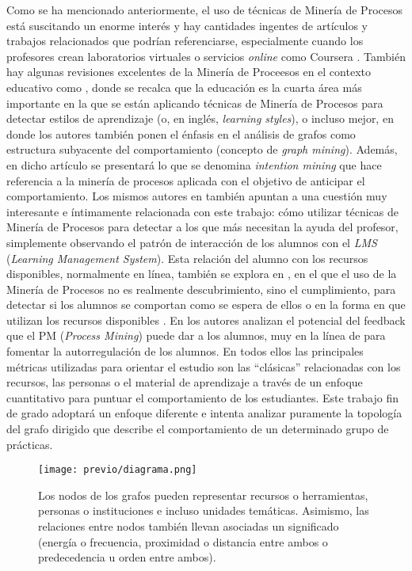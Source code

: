 Como se ha mencionado anteriormente, el uso de técnicas de Minería de Procesos está suscitando un enorme interés y hay cantidades ingentes de artículos y trabajos relacionados que podrían referenciarse, especialmente cuando los profesores crean laboratorios virtuales \cite{Elmoazen_2023} o servicios \emph{online} como Coursera \cite{mukala2015learning}. También hay algunas revisiones excelentes de la Minería de Proceesos en el contexto educativo como \cite{dos2019process}, donde se recalca que la educación es la cuarta área más importante en la que se están aplicando técnicas de Minería de Procesos para detectar estilos de aprendizaje (o, en inglés, \emph{learning styles}), o incluso mejor, en \cite{bogarin2018survey} donde los autores también ponen el énfasis en el análisis de grafos como estructura subyacente del comportamiento (concepto de \emph{graph mining}). Además, en dicho artículo se presentará lo que se denomina \emph{intention mining} que hace referencia a la minería de procesos aplicada con el objetivo de anticipar el comportamiento. Los mismos autores en \cite{bogarin2018discovering} también apuntan a una cuestión muy interesante e íntimamente relacionada con este trabajo: cómo utilizar técnicas de Minería de Procesos para detectar a los que más necesitan la ayuda del profesor, simplemente observando el patrón de interacción de los alumnos con el \emph{LMS} (\emph{Learning Management System}). Esta relación del alumno con los recursos disponibles, normalmente en línea, también se explora en \cite{mukala2015learning}, en el que el uso de la Minería de Procesos no es realmente descubrimiento, sino el cumplimiento, para detectar si los alumnos se comportan como se espera de ellos o en la forma en que utilizan los recursos disponibles \cite{juhavnak2019using}. En \cite{sedrakyan2016process} los autores analizan el potencial del
feedback que el PM (\emph{Process Mining}) puede dar a los alumnos, muy en la línea de \citep{Keller_1968} para fomentar la autorregulación de los alumnos. En todos ellos las principales métricas utilizadas para orientar el estudio son las ``clásicas'' relacionadas con los recursos, las personas o el material de aprendizaje a través de un enfoque cuantitativo para puntuar el comportamiento de los estudiantes. Este trabajo fin de grado adoptará un enfoque diferente e intenta analizar puramente la topología del grafo dirigido que describe el comportamiento de un determinado grupo de prácticas.

\begin{figure}[H]
    \centering
    \texttt{[image: previo/diagrama.png]}
    \caption{Los nodos de los grafos pueden representar recursos o herramientas, personas o instituciones e incluso unidades temáticas. Asimismo, las relaciones entre nodos también llevan asociadas un significado (energía o frecuencia, proximidad o distancia entre ambos o predecedencia u orden entre ambos).}
    \label{fig:classification}
\end{figure}

